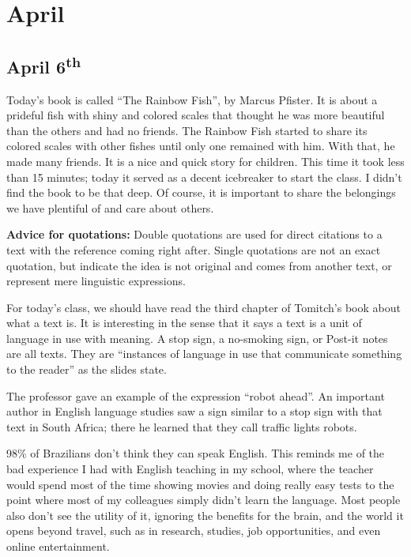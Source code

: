 \chapter{April}

\section[April 6th]{April 6\textsuperscript{th}}

Today's book is called ``The Rainbow Fish'', by Marcus Pfister. It is about a prideful fish with shiny and colored scales that thought he was more beautiful than the others and had no friends. The Rainbow Fish started to share its colored scales with other fishes until only one remained with him. With that, he made many friends. It is a nice and quick story for children. This time it took less than 15 minutes; today it served as a decent icebreaker to start the class. I didn't find the book to be that deep. Of course, it is important to share the belongings we have plentiful of and care about others.

\textbf{Advice for quotations:} Double quotations are used for direct citations to a text with the reference coming right after. Single quotations are not an exact quotation, but indicate the idea is not original and comes from another text, or represent mere linguistic expressions.

For today's class, we should have read the third chapter of Tomitch's book about what a text is. It is interesting in the sense that it says a text is a unit of language in use with meaning. A stop sign, a no-smoking sign, or Post-it notes are all texts. They are ``instances of language in use that communicate something to the reader'' as the slides state.

The professor gave an example of the expression ``robot ahead''. An important author in English language studies saw a sign similar to a stop sign with that text in South Africa; there he learned that they call traffic lights robots.

98\% of Brazilians don't think they can speak English. This reminds me of the bad experience I had with English teaching in my school, where the teacher would spend most of the time showing movies and doing really easy tests to the point where most of my colleagues simply didn't learn the language. Most people also don't see the utility of it, ignoring the benefits for the brain, and the world it opens beyond travel, such as in research, studies, job opportunities, and even online entertainment.

